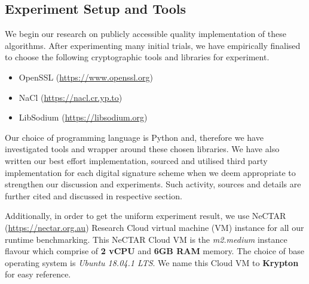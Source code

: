 \documentclass[10pt,sigconf]{acmart}
\begin{document}
\subsection{Experiment Setup and Tools}

We begin our research on publicly accessible quality implementation of these algorithms. After experimenting many initial trials, we have empirically finalised to choose the following cryptographic tools and libraries for experiment.
\begin{itemize}
    \item OpenSSL (\url{https://www.openssl.org})
    \item NaCl (\url{https://nacl.cr.yp.to})
    \item LibSodium (\url{https://libsodium.org})
\end{itemize}

Our choice of programming language is Python and, therefore we have investigated tools and wrapper around these chosen libraries. We have also written our best effort implementation, sourced and utilised third party implementation for each digital signature scheme when we deem appropriate to strengthen our discussion and experiments. Such activity, sources and details are further cited and discussed in respective section.

Additionally, in order to get the uniform experiment result, we use NeCTAR (\url{https://nectar.org.au}) Research Cloud virtual machine (VM) instance for all our runtime benchmarking. This NeCTAR Cloud VM is the \textit{m2.medium} instance flavour which comprise of \textbf{2 vCPU} and \textbf{6GB RAM} memory. The choice of base operating system is \textit{Ubuntu 18.04.1 LTS}. We name this Cloud VM to \textbf{Krypton} for easy reference. 
\end{document}
